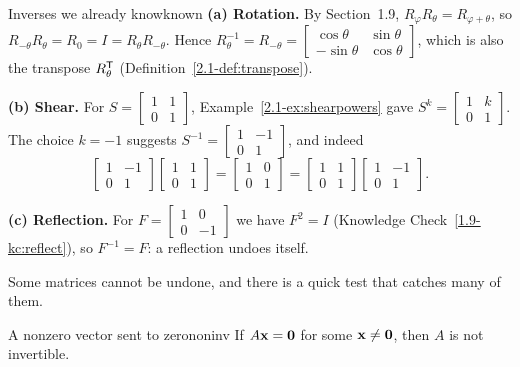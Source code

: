 \documentclass[11pt]{article}
\begin{document}
\begin{exmp}{Inverses we already know}{known}
\textbf{(a) Rotation.} By Section~1.9, $R_\varphi R_\theta=R_{\varphi+\theta}$, so $R_{-\theta}R_\theta=R_0=I=R_\theta R_{-\theta}$. Hence $R_\theta^{-1}=R_{-\theta}=\begin{bmatrix}\cos\theta&\sin\theta\\-\sin\theta&\cos\theta\end{bmatrix}$, which is also the transpose $R_\theta^{\mathsf T}$ (Definition~\ref{2.1-def:transpose}).

\textbf{(b) Shear.} For $S=\begin{bmatrix}1&1\\0&1\end{bmatrix}$, Example~\ref{2.1-ex:shearpowers} gave $S^k=\begin{bmatrix}1&k\\0&1\end{bmatrix}$. The choice $k=-1$ suggests $S^{-1}=\begin{bmatrix}1&-1\\0&1\end{bmatrix}$, and indeed
\[
\begin{bmatrix}1&-1\\0&1\end{bmatrix}\begin{bmatrix}1&1\\0&1\end{bmatrix}=\begin{bmatrix}1&0\\0&1\end{bmatrix}=\begin{bmatrix}1&1\\0&1\end{bmatrix}\begin{bmatrix}1&-1\\0&1\end{bmatrix}.
\]

\textbf{(c) Reflection.} For $F=\begin{bmatrix}1&0\\0&-1\end{bmatrix}$ we have $F^2=I$ (Knowledge Check~\ref{1.9-kc:reflect}), so $F^{-1}=F$: a reflection undoes itself.
\end{exmp}

Some matrices cannot be undone, and there is a quick test that catches many of them.

\begin{thm}{A nonzero vector sent to zero}{noninv}
If $A\mathbf{x}=\mathbf{0}$ for some $\mathbf{x}\neq\mathbf{0}$, then $A$ is not invertible.
\end{thm}
\end{document}
